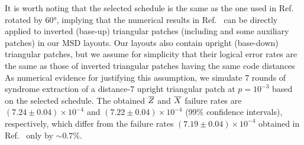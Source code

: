 \documentclass[
 prx,
 reprint,
 superscriptaddress,
 longbibliography,
 dvipsnames
]{revtex4-2}
\begin{document}

It is worth noting that the selected schedule is the same as the one used in Ref.~\cite{lee2025color} rotated by \ang{60}, implying that the numerical results in Ref.~\cite{lee2025color} can be directly applied to inverted (base-up) triangular patches (including \patchout and some auxiliary patches) in our MSD layouts.
Our layouts also contain upright (base-down) triangular patches, but we assume for simplicity that their logical error rates are the same as those of inverted triangular patches having the same code distances 
As numerical evidence for justifying this assumption, we simulate 7 rounds of syndrome extraction of a distance-7 upright triangular patch at $p=10^{-3}$ based on the selected schedule.
The obtained $\overline{Z}$ and $\overline{X}$ failure rates are $(7.24 \pm 0.04) \times 10^{-4}$ and $(7.22 \pm 0.04) \times 10^{-4}$ (99\% confidence intervals), respectively, which differ from the failure rates $(7.19 \pm 0.04) \times 10^{-4}$ obtained in Ref.~\cite{lee2025color} only by $\sim 0.7\%$.
\end{document}
